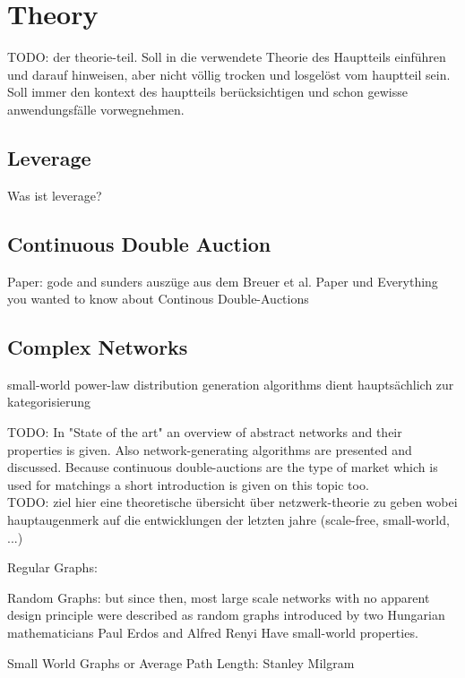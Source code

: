 \documentclass[../Bachelorarbeit.tex]{subfiles}
\begin{document}
\chapter{Theory}
TODO: der theorie-teil. Soll in die verwendete Theorie des Hauptteils einführen und darauf hinweisen, aber nicht völlig trocken und losgelöst vom hauptteil sein. Soll immer den kontext des hauptteils berücksichtigen und schon gewisse anwendungsfälle vorwegnehmen.

\section{Leverage}
Was ist leverage?
	
\section{Continuous Double Auction}	
Paper: gode and sunders
auszüge aus dem Breuer et al. Paper und Everything you wanted to know about Continous Double-Auctions

\section{Complex Networks}
small-world
power-law distribution
generation algorithms
dient hauptsächlich zur kategorisierung
		
TODO:
In "State of the art" an overview of abstract networks and their properties is given. Also network-generating algorithms are presented and discussed. Because continuous double-auctions are the type of market which is used for matchings a short introduction is given on this topic too.\\

TODO: ziel hier eine theoretische übersicht über  netzwerk-theorie zu geben wobei hauptaugenmerk auf die entwicklungen der letzten jahre (scale-free, small-world, ...)

Regular Graphs: \citep[vgl.]{BarabasiAlbert_StatisticalMechanics} \citep[vgl.]{Newman_ComplexNetworks}

Random Graphs: but since then, most large scale networks with no apparent design principle were described as random graphs introduced by two Hungarian mathematicians Paul Erdos and Alfred Renyi \citep[vgl.]{ErdosRenyi_RandomGraphs} \citep[vgl.]{ErdosRenyi_EvolutionRandomGraphs} Have small-world properties.

Small World Graphs or Average Path Length: Stanley Milgram \citep{TraverMilgram_StudySmallWorld} \citep{Milgram_SmallWorld} \citep{Kleinberg_SmallworldAlgorithmic}
\end{document}
